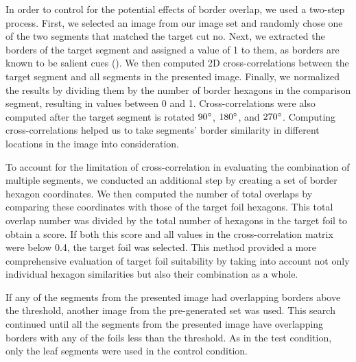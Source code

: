 \documentclass{article}
\begin{document}
In order to control for the potential effects of border overlap, we used a two-step process. First, we selected an image from our image set and randomly chose one of the two segments that matched the target cut no. Next, we extracted the borders of the target segment and assigned a value of 1 to them, as borders are known to be salient cues (\cite{peterson1994object}). We then computed 2D cross-correlations between the target segment and all segments in the presented image. Finally, we normalized the results by dividing them by the number of border hexagons in the comparison segment, resulting in values between 0 and 1. Cross-correlations were also computed after the target segment is rotated $90 \degree$, $180 \degree$, and $270 \degree$.  Computing cross-correlations helped us to take segments' border similarity in different locations in the image into consideration. 

To account for the limitation of cross-correlation in evaluating the combination of multiple segments, we conducted an additional step by creating a set of border hexagon coordinates. We then computed the number of total overlaps by comparing these coordinates with those of the target foil hexagons. This total overlap number was divided by the total number of hexagons in the target foil to obtain a score. If both this score and all values in the cross-correlation matrix were below 0.4, the target foil was selected. This method provided a more comprehensive evaluation of target foil suitability by taking into account not only individual hexagon similarities but also their combination as a whole. \label{crossCorr}

If any of the segments from the presented image had overlapping borders above the threshold, another image from the pre-generated set was used. This search continued until all the segments from the presented image have overlapping borders with any of the foils less than the threshold. As in the test condition, only the leaf segments were used in the control condition.
\end{document}
